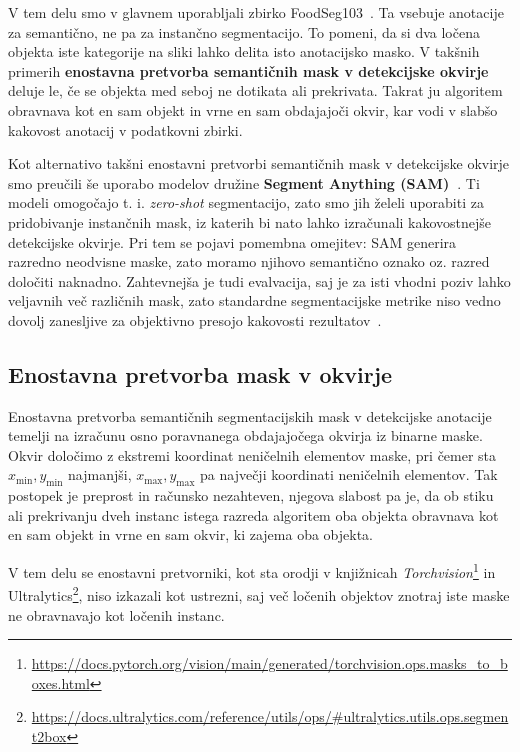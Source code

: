 \documentclass[a4paper,twoside,openright,12pt,slovene]{book}
\begin{document}
        V tem delu smo v glavnem uporabljali zbirko FoodSeg103~\cite{src:wu2021large}. Ta vsebuje anotacije za semantično, ne pa za instančno segmentacijo. To pomeni, da si dva ločena objekta iste kategorije na sliki lahko delita isto anotacijsko masko. V takšnih primerih \textbf{enostavna pretvorba semantičnih mask v detekcijske okvirje} deluje le, če se objekta med seboj ne dotikata ali prekrivata. Takrat ju algoritem obravnava kot en sam objekt in vrne en sam obdajajoči okvir, kar vodi v slabšo kakovost anotacij v podatkovni zbirki.

        Kot alternativo takšni enostavni pretvorbi semantičnih mask v detekcijske okvirje smo preučili še uporabo modelov družine
        \textbf{Segment Anything (SAM)~\cite{src:kirillov2023segment}}.
        Ti modeli omogočajo t. i. \emph{zero-shot} segmentacijo, zato smo jih želeli uporabiti za pridobivanje instančnih mask, iz katerih bi nato lahko izračunali kakovostnejše detekcijske okvirje. Pri tem se pojavi pomembna omejitev: SAM generira razredno neodvisne maske, zato moramo njihovo semantično oznako oz. razred določiti naknadno. Zahtevnejša je tudi evalvacija, saj je za isti vhodni poziv lahko veljavnih več različnih mask, zato standardne segmentacijske metrike niso vedno dovolj zanesljive za objektivno presojo kakovosti rezultatov~\cite{src:kirillov2023segment}.

        \subsection{Enostavna pretvorba mask v okvirje} \label{sct:enostavnapretvorba}

            Enostavna pretvorba semantičnih segmentacijskih mask v detekcijske anotacije temelji na izračunu osno poravnanega obdajajočega okvirja iz binarne maske. Okvir določimo z ekstremi koordinat neničelnih elementov maske, pri čemer sta \(x_{\min}, y_{\min}\) najmanjši, \(x_{\max}, y_{\max}\) pa največji koordinati neničelnih elementov. Tak postopek je preprost in računsko nezahteven, njegova slabost pa je, da ob stiku ali prekrivanju dveh instanc istega razreda algoritem oba objekta obravnava kot en sam objekt in vrne en sam okvir, ki zajema oba objekta.

            V tem delu se enostavni pretvorniki, kot sta orodji v knjižnicah \emph{Torchvision}\footnote{\url{https://docs.pytorch.org/vision/main/generated/torchvision.ops.masks_to_boxes.html}} in Ultralytics\footnote{\url{https://docs.ultralytics.com/reference/utils/ops/\#ultralytics.utils.ops.segment2box}}, niso izkazali kot ustrezni, saj več ločenih objektov znotraj iste maske ne obravnavajo kot ločenih instanc.
\end{document}
